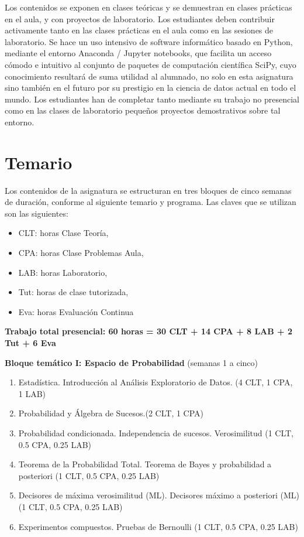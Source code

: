 \documentclass[11pt]{article}
\providecommand{\tightlist}{%
      \setlength{\itemsep}{0pt}\setlength{\parskip}{0pt}}
\begin{document}
    Los contenidos se exponen en clases teóricas y se demuestran en clases
prácticas en el aula, y con proyectos de laboratorio. Los estudiantes
deben contribuir activamente tanto en las clases prácticas en el aula
como en las sesiones de laboratorio. Se hace un uso intensivo de
software informático basado en Python, mediante el entorno Anaconda /
Jupyter notebooks, que facilita un acceso cómodo e intuitivo al conjunto
de paquetes de computación científica SciPy, cuyo conocimiento resultará
de suma utilidad al alumnado, no solo en esta asignatura sino también en
el futuro por su prestigio en la ciencia de datos actual en todo el
mundo. Los estudiantes han de completar tanto mediante su trabajo no
presencial como en las clases de laboratorio pequeños proyectos
demostrativos sobre tal entorno.



    \hypertarget{temario}{%
\section{Temario}\label{temario}}

Los contenidos de la asignatura se estructuran en tres bloques de cinco
semanas de duración, conforme al siguiente temario y programa. Las
claves que se utilizan son las siguientes:

\begin{itemize}
\tightlist
\item
  CLT: horas Clase Teoría,
\item
  CPA: horas Clase Problemas Aula,
\item
  LAB: horas Laboratorio,
\item
  Tut: horas de clase tutorizada,
\item
  Eva: horas Evaluación Continua
\end{itemize}

\textbf{Trabajo total presencial: 60 horas = 30 CLT + 14 CPA + 8 LAB + 2
Tut + 6 Eva}

    \textbf{Bloque temático I: Espacio de Probabilidad} (semanas 1 a cinco)

\begin{enumerate}
\def\labelenumi{\arabic{enumi}.}
\tightlist
\item
  Estadística. Introducción al Análisis Exploratorio de Datos. (4 CLT, 1
  CPA, 1 LAB)
\item
  Probabilidad y Álgebra de Sucesos.(2 CLT, 1 CPA)
\item
  Probabilidad condicionada. Independencia de sucesos. Verosimilitud (1
  CLT, 0.5 CPA, 0.25 LAB)
\item
  Teorema de la Probabilidad Total. Teorema de Bayes y probabilidad a
  posteriori (1 CLT, 0.5 CPA, 0.25 LAB)
\item
  Decisores de máxima verosimilitud (ML). Decisores máximo a posteriori
  (ML) (1 CLT, 0.5 CPA, 0.25 LAB)
\item
  Experimentos compuestos. Pruebas de Bernoulli (1 CLT, 0.5 CPA, 0.25
  LAB)
\end{enumerate}
\end{document}
